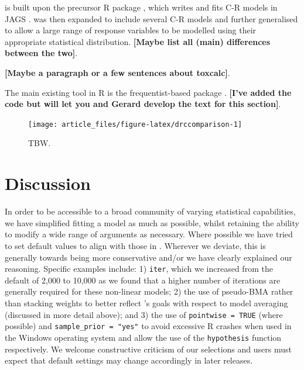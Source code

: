  is built upon the precursor R package ,
which writes and fits C-R models in JAGS \citep{Plummer2003}.
 was then expanded to include several C-R models and
further generalised to allow a large range of response variables to be
modelled using their appropriate statistical distribution.
\textbf{{[}Maybe list all (main) differences between the two{]}}.

\textbf{{[}Maybe a paragraph or a few sentences about toxcalc{]}}.

The main existing tool in R is the frequentist-based package 
\citep{Ritz2016}. \textbf{{[}I've added the code but will let you and
Gerard develop the text for this section{]}}.

\begin{Schunk}
\begin{figure}[!ht]

{\centering \texttt{[image: article\_files/figure-latex/drccomparison-1]} 

}

\caption[TBW]{TBW.}\label{fig:drccomparison}
\end{figure}
\end{Schunk}

\hypertarget{discussion}{%
\section{Discussion}\label{discussion}}

In order to be accessible to a broad community of varying statistical
capabilities, we have simplified fitting a  model as much
as possible, whilst retaining the ability to modify a wide range of
arguments as necessary. Where possible we have tried to set default
values to align with those in . Wherever we deviate, this is
generally towards being more conservative and/or we have clearly
explained our reasoning. Specific examples include: 1) \texttt{iter},
which we increased from the  default of 2,000 to 10,000 as we
found that a higher number of iterations are generally required for
these non-linear models; 2) the use of pseudo-BMA rather than stacking
weights to better reflect 's goals with respect to model
averaging (discussed in more detail above); and 3) the use of
\texttt{pointwise\ =\ TRUE} (where possible) and
\texttt{sample\_prior\ =\ "yes"} to avoid excessive R crashes when used
in the Windows operating system and allow the use of the
\texttt{hypothesis} function respectively. We welcome constructive
criticism of our selections and users must expect that default settings
may change accordingly in later releases.

